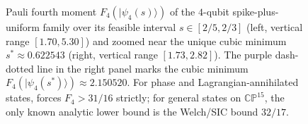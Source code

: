 \documentclass[11pt,a4paper]{article}
\theoremstyle{plain}
\theoremstyle{definition}
\theoremstyle{remark}
\newcommand{\CP}{\mathbb{CP}}
\newcommand{\ket}[1]{|#1\rangle}
\numberwithin{equation}{section}
\begin{document}
\begin{figure}[htbp]
\caption{Pauli fourth moment $F_4(\ket{\psi_4(s)})$ of the $4$-qubit spike-plus-uniform family over its feasible interval $s \in [2/5, 2/3]$ (left, vertical range $[1.70, 5.30]$) and zoomed near the unique cubic minimum $s^* \approx 0.622543$ (right, vertical range $[1.73, 2.82]$). The purple dash-dotted line in the right panel marks the cubic minimum $F_4(\ket{\psi_4(s^*)}) \approx 2.150520$. For phase and Lagrangian-annihilated states,  forces $F_4 > 31/16$ strictly; for general states on $\CP^{15}$, the only known analytic lower bound is the Welch/SIC bound $32/17$.}\label{fig:spike-f4}
\end{figure}
\end{document}
